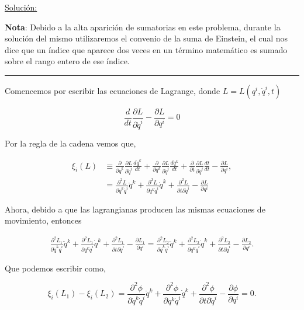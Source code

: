 \documentclass[a4paper,10pt]{article}
\numberwithin{equation}{section}
\begin{document}
\vspace{.3cm}

\underline{Solución:} \vspace{.3cm}

\textbf{Nota}: Debido a la alta aparición de sumatorias en este problema, durante la
solución del mismo utilizaremos el convenio de la suma de Einstein, el cual nos dice 
que un índice que aparece dos veces en un término matemático es sumado sobre 
el rango entero de ese índice.

\noindent\rule[0.5ex]{\linewidth}{1pt}

Comencemos por escribir las ecuaciones de Lagrange, donde $L = L(q^i,\dot{q}^i,t)$

\begin{equation}
 \frac{d}{dt}\frac{\partial L}{\partial \dot{q}^i} - \frac{\partial L}{\partial q^i} = 0 
\end{equation}

Por la regla de la cadena vemos que, 

\begin{align*}
 \xi_i (L) &\equiv \frac{\partial}{\partial \dot{q}^k}\frac{\partial L}{\partial \dot{q}^i} 
 \frac{d\dot{q}^k}{dt} + \frac{\partial}{\partial q^k}\frac{\partial L}{\partial \dot{q}^i} 
 \frac{dq^k}{dt} + \frac{\partial}{\partial t}\frac{\partial L}{\partial \dot{q}^i} \frac{dt}{dt}
 - \frac{\partial L}{\partial q^i}, \\
 &= \frac{\partial^2 L}{\partial \dot{q}^k\dot{q}^i} \ddot{q}^k + 
 \frac{\partial^2 L}{\partial q^k \dot{q}^i} \dot{q}^k+ \frac{\partial^2 L}{\partial t \partial \dot{q}^i}
 - \frac{\partial L}{\partial q^i}
 \end{align*}

Ahora, debido a que las lagrangianas producen las mismas ecuaciones de movimiento,
entonces 

\begin{align}
 \frac{\partial^2 L_1}{\partial \dot{q}^k\dot{q}^i} \ddot{q}^k + 
 \frac{\partial^2 L_1}{\partial q^k \dot{q}^i} \dot{q}^k+ \frac{\partial^2 L_1}{\partial t \partial \dot{q}^i}
 - \frac{\partial L_1}{\partial q^i} = \frac{\partial^2 L_2}{\partial \dot{q}^k\dot{q}^i} \ddot{q}^k + 
 \frac{\partial^2 L_2}{\partial q^k \dot{q}^i} \dot{q}^k+ \frac{\partial^2 L_2}{\partial t \partial \dot{q}^i}
 - \frac{\partial L_2}{\partial q^i}.
\end{align}

Que podemos escribir como,

\begin{equation}
 \xi_i (L_1) - \xi_i (L_2) = \frac{\partial^2 \phi}{\partial \dot{q}^k\dot{q}^i} \ddot{q}^k
 + \frac{\partial^2 \phi}{\partial q^k \dot{q}^i} \dot{q}^k + \frac{\partial^2 \phi}{\partial t \partial \dot{q}^i}  
 - \frac{\partial \phi}{\partial q^i} = 0.
 \label{eq:4cero}
 \end{equation}
\end{document}
